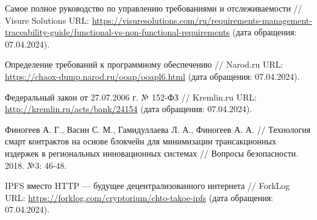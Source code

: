 \begin{thebibliography}{99\kern\bibindent}
	 Самое полное руководство по управлению требованиями и отслеживаемости // Visure Solutions URL: \url{https://visuresolutions.com/ru/requirements-management-traceability-guide/functional-vs-non-functional-requirements} (дата обращения: 07.04.2024).

	 Определение требований к программному обеспечению  // Narod.ru URL: \url{https://chaox-dump.narod.ru/ooap/ooapl6.html} (дата обращения: 07.04.2024).

	 Федеральный закон от 27.07.2006 г. № 152-ФЗ // Kremlin.ru URL: \url{http://kremlin.ru/acts/bank/24154} (дата обращения: 07.04.2024).
	
	 Финогеев А. Г., Васин С. М., Гамидуллаева Л. А., Финогеев А. А. // Технология смарт контрактов на основе блокчейн для минимизации трансакционных издержек в региональных инновационных системах // Вопросы безопасности. 2018. №3: 46-48. %

	 IPFS вместо HTTP — будущее децентрализованного интернета // ForkLog URL: \url{https://forklog.com/cryptorium/chto-takoe-ipfs} (дата обращения: 07.04.2024).
	
\end{thebibliography}
